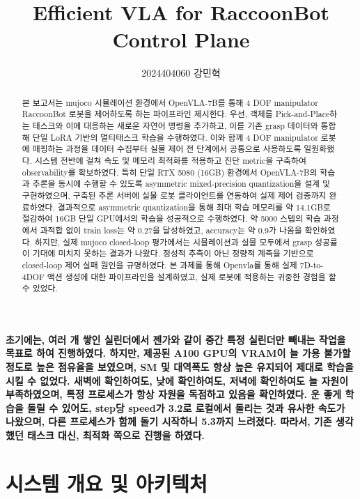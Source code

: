 \documentclass[11pt,a4paper]{article}
\title{Efficient VLA for RaccoonBot Control Plane}
\author{2024404060 강민혁}
\begin{document}
\maketitle

\begin{abstract}
\noindent
본 보고서는 mujoco 시뮬레이션 환경에서 OpenVLA-7B를 통해 4 DOF manipulator RaccoonBot 로봇을 제어하도록 하는 파이프라인 제시한다.
우선, 객체를 Pick-and-Place하는 태스크와 이에 대응하는 새로운 자연어 명령을 추가하고, 
이를 기존 grasp 데이터와 통합해 단일 LoRA 기반의 멀티태스크 학습을 수행하였다.
이와 함께 4 DOF manipulator 로봇에 매핑하는 과정을 데이터 수집부터 실물 제어 전 단계에서 공통으로 사용하도록 일원화했다.
시스템 전반에 걸쳐 속도 및 메모리 최적화를 적용하고 진단 metric을 구축하여 observability를 확보하였다.
특히 단일 RTX 5080 (16GB) 환경에서 OpenVLA-7B의 학습과 추론을 동시에 수행할 수 있도록
asymmetric mixed-precision quantization을 설계 및 구현하였으며,
구축된 추론 서버에 실물 로봇 클라이언트를 연동하여 실제 제어 검증까지 완료하였다.
결과적으로 asymmetric quantization을 통해 최대 학습 메모리를 약 14.1GB로
절감하여 16GB 단일 GPU에서의 학습을 성공적으로 수행하였다.
약 5000 스텝의 학습 과정에서 과적합 없이 train loss는 약 0.27을 달성하였고, accuracy는 약 0.9가 나옴을 확인하였다.
하지만, 실제 mujoco closed-loop 평가에서는 시뮬레이션과 실물 모두에서
grasp 성공률이 기대에 미치지 못하는 결과가 나왔다. 정성적 추측이 아닌 정량적 계측을 기반으로 closed-loop 제어 실패 원인을 규명하였다.
본 과제를 통해 Openvla를 통해 실제 7D-to-4DOF 액션 생성에 대한 파이프라인을 설계하였고, 실제 로봇에 적용하는 귀중한 경험을 할 수 있었다.
\end{abstract}


\textbf{초기에는, 여러 개 쌓인 실린더에서 젠가와 같이 중간 특정 실린더만 빼내는 작업을 목표로 하여 진행하였다.
하지만, 제공된 A100 GPU의 VRAM이 늘 가용 불가할 정도로 높은 점유율을 보였으며,
SM 및 대역폭도 항상 높은 유지되어 제대로 학습을 시킬 수 없었다.
새벽에 확인하여도, 낮에 확인하여도, 저녁에 확인하여도 늘 자원이 부족하였으며, 
특정 프로세스가 항상 자원을 독점하고 있음을 확인하였다.
운 좋게 학습을 돌릴 수 있어도, step당 speed가 3.2로 로컬에서 돌리는 것과 유사한 속도가 나왔으며, 
다른 프로세스가 함께 돌기 시작하니 5.3까지 느려졌다.
따라서, 기존 생각했던 태스크 대신, 최적화 쪽으로 진행을 하였다.}

\section{시스템 개요 및 아키텍처}
\label{sec:overview}
\end{document}
